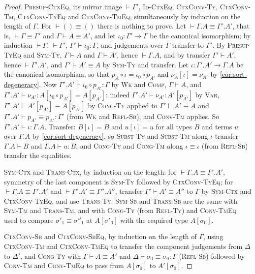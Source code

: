 \begin{proof}
    \textsc{Presup-CtxEq}, its mirror image $\vdash \Gamma'$, \textsc{Id-CtxEq}, \textsc{CtxConv-Ty}, \textsc{CtxConv-Tm}, \textsc{CtxConv-TyEq} and \textsc{CtxConv-TmEq}, simultaneously by induction on the length of $\Gamma$. For $\vdash () \equiv ()$ there is nothing to prove. Let $\vdash \Gamma.A \equiv \Gamma'.A'$, that is, $\vdash \Gamma \equiv \Gamma'$ and $\Gamma \vdash A \equiv A'$, and let $\iota_0 : \Gamma' \to \Gamma$ be the canonical isomorphism; by induction $\vdash \Gamma$, $\vdash \Gamma'$, $\Gamma' \vdash \iota_0 : \Gamma$, and judgements over $\Gamma$ transfer to $\Gamma'$. By \textsc{Presup-TyEq} and \textsc{Sym-Ty}, $\Gamma \vdash A$ and $\Gamma \vdash A'$, hence $\vdash \Gamma.A$, and by transfer $\Gamma' \vdash A'$, hence $\vdash \Gamma'.A'$, and $\Gamma' \vdash A' \equiv A$ by \textsc{Sym-Ty} and transfer. Let $\iota : \Gamma'.A' \to \Gamma.A$ be the canonical isomorphism, so that $p_A \circ \iota = \iota_0 \circ p_{A'}$ and $\nu_A[\iota] = \nu_{A'}$ by \cref{cor:sort-degeneracy}. Now $\Gamma'.A' \vdash \iota_0 \circ p_{A'} : \Gamma$ by \textsc{Wk} and \textsc{Comp}, $\Gamma \vdash A$, and $\Gamma'.A' \vdash \nu_{A'} : A[\iota_0 \circ p_{A'}] = A[p_{A'}]$: indeed $\Gamma'.A' \vdash \nu_{A'} : A'[p_{A'}]$ by \textsc{Var}, $\Gamma'.A' \vdash A'[p_{A'}] \equiv A[p_{A'}]$ by \textsc{Cong-Ty} applied to $\Gamma' \vdash A' \equiv A$ and $\Gamma'.A' \vdash p_{A'} \equiv p_{A'} : \Gamma'$ (from \textsc{Wk} and \textsc{Refl-Sb}), and \textsc{Conv-Tm} applies. So $\Gamma'.A' \vdash \iota : \Gamma.A$. Transfer: $B[\iota] = B$ and $u[\iota] = u$ for all types $B$ and terms $u$ over $\Gamma.A$ by \cref{cor:sort-degeneracy}, so \textsc{Subst-Ty} and \textsc{Subst-Tm} along $\iota$ transfer $\Gamma.A \vdash B$ and $\Gamma.A \vdash u : B$, and \textsc{Cong-Ty} and \textsc{Cong-Tm} along $\iota \equiv \iota$ (from \textsc{Refl-Sb}) transfer the equalities.

    \textsc{Sym-Ctx} and \textsc{Trans-Ctx}, by induction on the length: for $\vdash \Gamma.A \equiv \Gamma'.A'$, symmetry of the last component is \textsc{Sym-Ty} followed by \textsc{CtxConv-TyEq}; for $\vdash \Gamma.A \equiv \Gamma'.A'$ and $\vdash \Gamma'.A' \equiv \Gamma''.A''$, transfer $\Gamma' \vdash A' \equiv A''$ to $\Gamma$ by \textsc{Sym-Ctx} and \textsc{CtxConv-TyEq}, and use \textsc{Trans-Ty}. \textsc{Sym-Sb} and \textsc{Trans-Sb} are the same with \textsc{Sym-Tm} and \textsc{Trans-Tm}, and with \textsc{Cong-Ty} (from \textsc{Refl-Ty}) and \textsc{Conv-TmEq} used to compare $\sigma'_1 \equiv \sigma''_1$ at $A[\sigma'_0]$ with the required type $A[\sigma_0]$.

    \textsc{CtxConv-Sb} and \textsc{CtxConv-SbEq}, by induction on the length of $\Gamma$, using \textsc{CtxConv-Tm} and \textsc{CtxConv-TmEq} to transfer the component judgements from $\Delta$ to $\Delta'$, and \textsc{Cong-Ty} with $\Gamma \vdash A \equiv A'$ and $\Delta \vdash \sigma_0 \equiv \sigma_0 : \Gamma$ (\textsc{Refl-Sb}) followed by \textsc{Conv-Tm} and \textsc{Conv-TmEq} to pass from $A[\sigma_0]$ to $A'[\sigma_0]$.
\end{proof}

